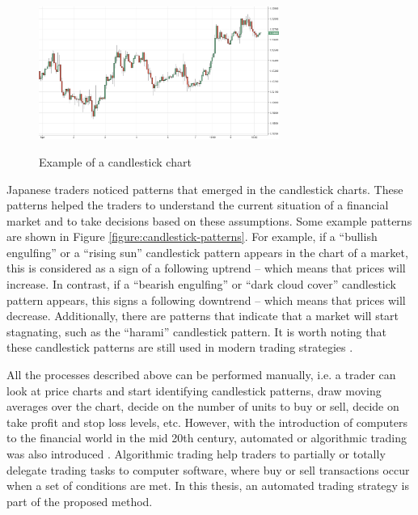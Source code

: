 \begin{figure}
\caption{Example of a candlestick chart}
\centering

\includegraphics[width=0.7\textwidth]{img/candlestick-chart.png}
\label{figure:candlestick-chart}
\end{figure}

Japanese traders noticed patterns that emerged in the candlestick charts. These
patterns helped the traders to understand the current situation of a financial
market and to take decisions based on these assumptions. Some example patterns
are shown in Figure \ref{figure:candlestick-patterns}. For example, if a
``bullish engulfing'' or a ``rising sun'' candlestick pattern appears in the chart
of a market, this is considered as a sign of a following uptrend -- which means
that prices will increase. In contrast, if a ``bearish engulfing'' or ``dark cloud
cover'' candlestick pattern appears, this signs a following downtrend -- which
means that prices will decrease. Additionally, there are patterns that indicate
that a market will start stagnating, such as the ``harami'' candlestick
pattern. It is worth noting that these candlestick patterns are still used in
modern trading strategies \cite{Nison1991}.

All the processes described above can be performed manually, i.e. a trader can
look at price charts and start identifying candlestick patterns, draw moving
averages over the chart, decide on the number of units to buy or sell, decide on
take profit and stop loss levels, etc. However, with the introduction of
computers to the financial world in the mid 20th century, automated or
algorithmic trading was also introduced \cite{Hendershott2011}. Algorithmic
trading help traders to partially or totally delegate trading tasks to computer
software, where buy or sell transactions occur when a set of conditions are
met. In this thesis, an automated trading strategy is part of the proposed
method.

